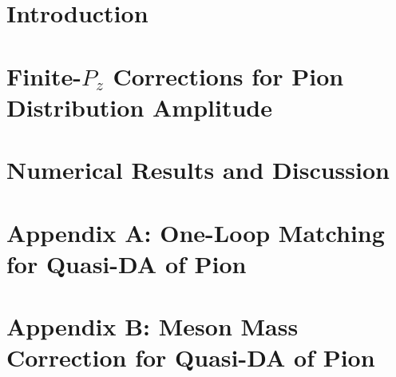 \documentclass[prd,aps,nofootinbib,superscriptaddress,showpacs,floatfix,preprintnumbers]{revtex4}
\begin{document}
\maketitle

\section{Introduction}\label{sec:intro}


\section{Finite-$P_z$ Corrections for Pion Distribution Amplitude}\label{sec:corrections}


\section{Numerical Results and Discussion}\label{sec:num}


\section*{Appendix A: One-Loop Matching for Quasi-DA of Pion}\label{sec:oneloop_appendix}


\section*{Appendix B: Meson Mass Correction for Quasi-DA of Pion}
\label{sec:mmc_appendix}


\ifx\@bibitemShut\undefined\let\@bibitemShut\relax\fi
\makeatother

\end{document}
